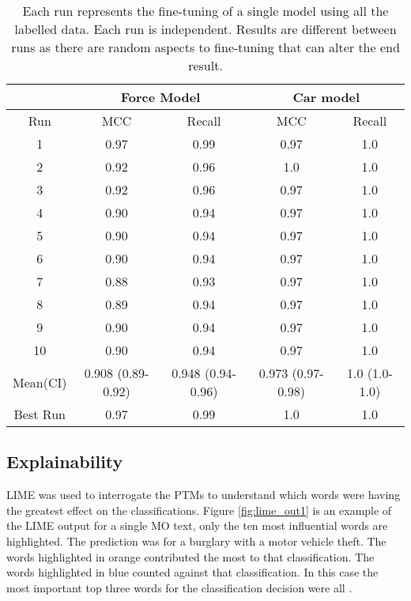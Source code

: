 \begin{table}[]
\begin{tabular}{@{}ccccc@{}}
\toprule
\multicolumn{1}{l}{} & \multicolumn{2}{c}{Force Model}       & \multicolumn{2}{c}{Car model} \\\midrule
Run                  & MCC               & Recall            & MCC                & Recall   \\\midrule
1                    & 0.97              & 0.99              & 0.97               & 1.0        \\
2                    & 0.92              & 0.96              & 1.0                  & 1.0        \\
3                    & 0.92              & 0.96              & 0.97               & 1.0        \\
4                    & 0.90               & 0.94              & 0.97               & 1.0        \\
5                    & 0.90               & 0.94              & 0.97               & 1.0        \\
6                    & 0.90               & 0.94              & 0.97               & 1.0        \\
7                    & 0.88              & 0.93              & 0.97               & 1.0        \\
8                    & 0.89              & 0.94              & 0.97               & 1.0        \\
9                    & 0.90               & 0.94              & 0.97               & 1.0        \\
10                   & 0.90               & 0.94              & 0.97               & 1.0        \\\midrule
Mean(CI)             & 0.908 (0.89-0.92) & 0.948 (0.94-0.96) & 0.973 (0.97-0.98)  & 1.0 (1.0-1.0)  \\\midrule
Best Run             & 0.97              & 0.99              & 1.0                  & 1.0        \\ \bottomrule
\end{tabular}
\caption{\label{tab:final-model} Each run represents the fine-tuning of a single model using all the labelled data. Each run is independent. Results are different between runs as there are random aspects to fine-tuning that can alter the end result. }
\end{table}

\subsection{Explainability} LIME was used to interrogate the PTMs to understand which words were having the greatest effect on the classifications. Figure \ref{fig:lime_out1} is an example of the LIME output for a single MO text, only the ten most influential words are highlighted.  The prediction was for a burglary with a motor vehicle theft. The words highlighted in orange contributed the most to that classification. The words highlighted in blue counted against that classification. In this case the most important top three words for the classification decision were all . 


